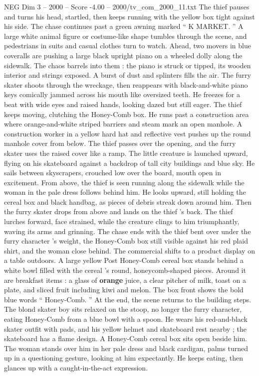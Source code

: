\begin{textsample}{NEG Dim 3 – 2000 – Score -4.00 – 2000/tv\_com\_2000\_11.txt}
The thief pauses and turns his head, startled, then keeps running with the yellow box tight against his side.
The chase continues past a green awning marked “ K MARKET. ” A large white animal figure or costume-like shape tumbles through the scene, and pedestrians in suits and casual clothes turn to watch.
Ahead, two movers in blue coveralls are pushing a large black upright piano on a wheeled dolly along the sidewalk.
The chaos barrels into them : the piano is struck or tipped, its wooden interior and strings exposed.
A burst of dust and splinters fills the air.
The furry skater shoots through the wreckage, then reappears with black-and-white piano keys comically jammed across his mouth like oversized teeth.
He freezes for a beat with wide eyes and raised hands, looking dazed but still eager.
The thief keeps moving, clutching the Honey-Comb box.
He runs past a construction area where orange-and-white striped barriers and steam mark an open manhole.
A construction worker in a yellow hard hat and reflective vest pushes up the round manhole cover from below.
The thief passes over the opening, and the furry skater uses the raised cover like a ramp.
The little creature is launched upward, flying on his skateboard against a backdrop of tall city buildings and blue sky.
He sails between skyscrapers, crouched low over the board, mouth open in excitement.
From above, the thief is seen running along the sidewalk while the woman in the pale dress follows behind him.
He looks upward, still holding the cereal box and black handbag, as pieces of debris streak down around him.
Then the furry skater drops from above and lands on the thief ’s back.
The thief lurches forward, face strained, while the creature clings to him triumphantly, waving its arms and grinning.
The chase ends with the thief bent over under the furry character ’s weight, the Honey-Comb box still visible against his red plaid shirt, and the woman close behind.
The commercial shifts to a product display on a table outdoors.
A large yellow Post Honey-Comb cereal box stands behind a white bowl filled with the cereal ’s round, honeycomb-shaped pieces.
Around it are breakfast items : a glass of \textbf{orange} juice, a clear pitcher of milk, toast on a plate, and sliced fruit including kiwi and melon.
The box front shows the bold blue words “ Honey-Comb. ” At the end, the scene returns to the building steps.
The blond skater boy sits relaxed on the stoop, no longer the furry character, eating Honey-Comb from a blue bowl with a spoon.
He wears his red-and-black skater outfit with pads, and his yellow helmet and skateboard rest nearby ; the skateboard has a flame design.
A Honey-Comb cereal box sits open beside him.
The woman stands over him in her pale dress and black cardigan, palms turned up in a questioning gesture, looking at him expectantly.
He keeps eating, then glances up with a caught-in-the-act expression.

\end{textsample}
